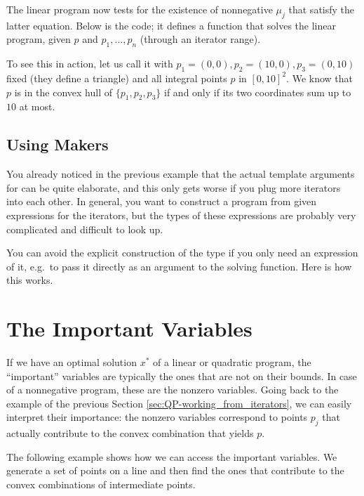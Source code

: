The linear program now tests for the existence of nonnegative $\mu_j$
that satisfy the latter equation. Below is the code; it defines a
function that solves the linear program, given $p$ and
$p_1,\ldots,p_n$ (through an iterator range).


To see this in action, let us call it with $p_1=(0,0), p_2=(10,0),
p_3=(0,10)$ fixed (they define a triangle) and all integral points $p$
in $[0,10]^2$. We know that $p$ is in the convex hull of
$\{p_1,p_2,p_3\}$ if and only if its two coordinates sum up to $10$ at
most.


\subsection{Using Makers}
You already noticed in the previous example that the actual 
template arguments for 
can be quite elaborate, and this only gets worse if you plug more 
iterators into each other. In general, you want to construct a 
program from given expressions for the iterators, but the
types of these expressions are probably very complicated and 
difficult to look up. 

You can avoid the explicit construction of the type
if you only need an expression of it, e.g.\ to pass it directly 
as an argument to the solving function. Here is how this works.


\section{The Important Variables}
If we have an optimal solution $x^*$ of a linear or quadratic program,
the ``important'' variables are typically the ones that are not on
their bounds. In case of a nonnegative program, these are the nonzero
variables.  Going back to the example of the previous Section
\ref{sec:QP-working_from_iterators}, we can easily interpret their
importance: the nonzero variables correspond to points $p_j$ that
actually contribute to the convex combination that yields $p$. 

The following example shows how we can access the important variables.
We generate a set of points on a line and then find the ones that 
contribute to the convex combinations of intermediate points.

